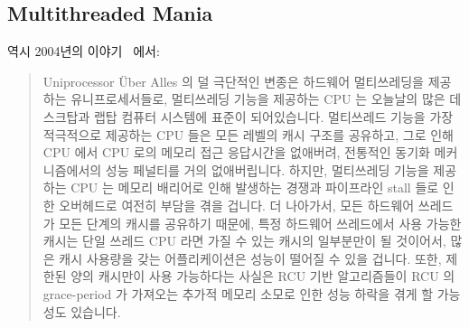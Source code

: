 \subsection{Multithreaded Mania}
\label{sec:future:Multithreaded Mania}

역시 2004년의 이야기~\cite{PaulEdwardMcKenneyPhD} 에서:

\begin{quote}
	Uniprocessor \"Uber Alles 의 덜 극단적인 변종은 하드웨어 멀티쓰레딩을
	제공하는 유니프로세서들로, 멀티쓰레딩 기능을 제공하는 CPU 는 오늘날의
	많은 데스크탑과 랩탑 컴퓨터 시스템에 표준이 되어있습니다.  멀티쓰레드
	기능을 가장 적극적으로 제공하는 CPU 들은 모든 레벨의 캐시 구조를
	공유하고, 그로 인해 CPU 에서 CPU 로의 메모리 접근 응답시간을 없애버려,
	전통적인 동기화 메커니즘에서의 성능 페널티를 거의 없애버립니다.
	하지만, 멀티쓰레딩 기능을 제공하는 CPU 는 메모리 배리어로 인해 발생하는
	경쟁과 파이프라인 stall 들로 인한 오버헤드로 여전히 부담을 겪을 겁니다.
	더 나아가서, 모든 하드웨어 쓰레드가 모든 단계의 캐시를 공유하기 때문에,
	특정 하드웨어 쓰레드에서 사용 가능한 캐시는 단일 쓰레드 CPU 라면 가질
	수 있는 캐시의 일부분만이 될 것이어서, 많은 캐시 사용량을 갖는
	어플리케이션은 성능이 떨어질 수 있을 겁니다.  또한, 제한된 양의
	캐시만이 사용 가능하다는 사실은 RCU 기반 알고리즘들이 RCU 의
	grace-period 가 가져오는 추가적 메모리 소모로 인한 성능 하락을 겪게 할
	가능성도 있습니다.

\end{quote}
